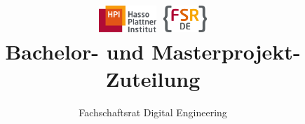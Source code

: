 \usepackage{fancyhdr}
\pagestyle{fancy}

\fancyhead{}
\renewcommand{\headrulewidth}{1pt}

\title{\includegraphics[height=1cm]{./images/hpi_logo}
    \hfill\includegraphics[height=1cm]{./images/FSR_DE_color}\\\bigskip
    \textbf{Bachelor- und Masterprojekt-Zuteilung}\\}
\author{Fachschaftsrat Digital Engineering}
\date{}
